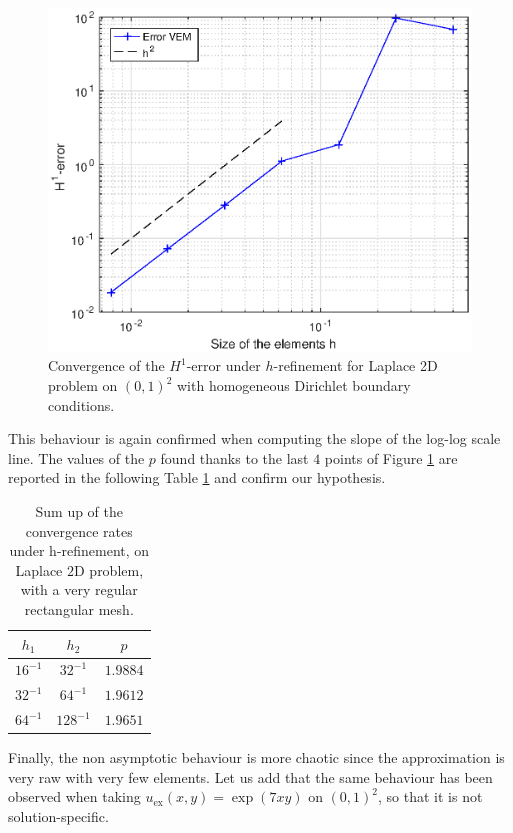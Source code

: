 \begin{figure}[!h]
\centering
\includegraphics[scale=0.8]{images/convergencePlot2D.eps}
\caption{Convergence of the $H^1$-error under $h$-refinement for Laplace 2D problem on $(0,1)^2$ with homogeneous Dirichlet boundary conditions.}
\label{img:conv2d}
\end{figure}
This behaviour is again confirmed when computing the slope of the log-log scale line. The values of the $p$ found thanks to the last $4$ points of Figure \ref{img:conv2d} are reported in the following Table \ref{tableRect} and confirm our hypothesis.
\begin{table}[h!]
\begin{center}
\begin{tabular}{|c|c|c|}
\hline
$h_1$ & $h_2$ & $p$ \\
\hline
$16^{-1}$ & $32^{-1}$ & $1.9884$\\
\hline
$32^{-1}$ & $64^{-1}$ & $1.9612$\\
\hline
$64^{-1}$ & $128^{-1}$ & $1.9651$\\
\hline
\end{tabular}
\end{center}
\caption{Sum up of the convergence rates under h-refinement, on Laplace $2$D problem, with a very regular rectangular mesh.} \label{tableRect}
\end{table}
Finally, the non asymptotic behaviour is more chaotic since the approximation is very raw with very few elements. Let us add that the same behaviour has been observed when taking $u_\text{ex}(x,y)=\exp(7xy)$ on $(0,1)^2$, so that it is not solution-specific.\\

